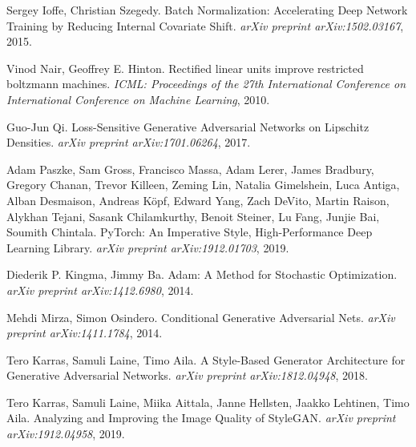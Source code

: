\documentclass[12pt, a4paper]{article}
\begin{document}
\begin{thebibliography}{9}
	Sergey Ioffe, Christian Szegedy. Batch Normalization: Accelerating Deep Network Training by Reducing Internal Covariate Shift. \textit{arXiv preprint arXiv:1502.03167}, 2015.
	
	Vinod Nair, Geoffrey E. Hinton. Rectified linear units improve restricted boltzmann machines. \textit{ICML: Proceedings of the 27th International Conference on International Conference on Machine Learning}, 2010.
	
	Guo-Jun Qi. Loss-Sensitive Generative Adversarial Networks on Lipschitz Densities. \textit{arXiv preprint arXiv:1701.06264}, 2017.
	
	Adam Paszke, Sam Gross, Francisco Massa, Adam Lerer, James Bradbury, Gregory Chanan, Trevor Killeen, Zeming Lin, Natalia Gimelshein, Luca Antiga, Alban Desmaison, Andreas Köpf, Edward Yang, Zach DeVito, Martin Raison, Alykhan Tejani, Sasank Chilamkurthy, Benoit Steiner, Lu Fang, Junjie Bai, Soumith Chintala. PyTorch: An Imperative Style, High-Performance Deep Learning Library. \textit{arXiv preprint arXiv:1912.01703}, 2019.
	
	Diederik P. Kingma, Jimmy Ba. Adam: A Method for Stochastic Optimization. \textit{arXiv preprint arXiv:1412.6980}, 2014.
	
	Mehdi Mirza, Simon Osindero. Conditional Generative Adversarial Nets. \textit{arXiv preprint arXiv:1411.1784}, 2014.
	
	Tero Karras, Samuli Laine, Timo Aila. A Style-Based Generator Architecture for Generative Adversarial Networks. \textit{arXiv preprint arXiv:1812.04948}, 2018.
	
	Tero Karras, Samuli Laine, Miika Aittala, Janne Hellsten, Jaakko Lehtinen, Timo Aila. Analyzing and Improving the Image Quality of StyleGAN. \textit{arXiv preprint arXiv:1912.04958}, 2019.
\end{thebibliography}
\end{document}
